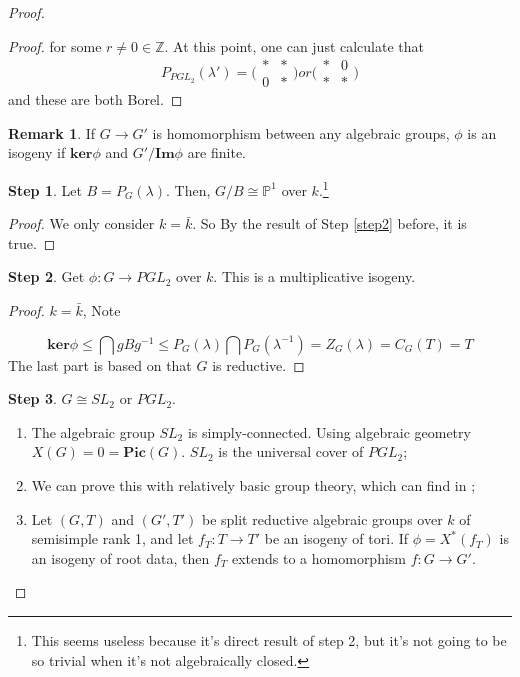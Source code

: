 \documentclass[12pt,a4paper,english]{article}
\theoremstyle{plain}
\theoremstyle{definition}
\newtheorem*{rem}{Remark}
\newtheorem{step}{Step}
\begin{document}
\begin{proof}
\begin{proof}
for some $r\not=0\in\mathbb{Z}$. At this point, one can just calculate that 
\begin{equation*}
    P_{PGL_{2}}(\lambda')=
    \bigg(\begin{array}{cc}
         *&*  \\
         0& *
    \end{array}\bigg)
or
\bigg(\begin{array}{cc}
     *&0  \\
     *& *
\end{array}\bigg)
\end{equation*}
and these are both Borel.
\end{proof}
\begin{rem}
If $G\rightarrow G'$ is homomorphism between any algebraic groups, $\phi$ is an isogeny if $\textbf{ker}\phi$ and $G'/\textbf{Im}\phi$ are finite.
\end{rem}
\begin{step}
Let $B=P_{G}(\lambda)$. Then, $G/B\cong \mathbb{P}^{1}$ over $k$.\footnote{This seems useless because it's direct result of step 2, but it's not going to be so trivial when it's not algebraically closed.}
\end{step}
\begin{proof}
We only consider $k=\bar{k}$. So By the result of Step \ref{step2} before, it is true.
\end{proof}
\begin{step}
Get $\phi:G\rightarrow PGL_{2}$ over $k$. This is a multiplicative isogeny.
\end{step}
\begin{proof}
$k=\bar{k}$, Note

\begin{equation*}
    \textbf{ker}\phi\leq \bigcap gBg^{-1}\leq P_{G}(\lambda)\bigcap P_{G}(\lambda^{-1})=Z_{G}(\lambda)=C_{G}(T)=T
\end{equation*}
The last part is based on that $G$ is reductive.
\end{proof}
\begin{step}
$G\cong SL_{2}$ or $PGL_{2}$.
\end{step}


\begin{enumerate}
    \item The algebraic group $SL_{2}$ is simply-connected. Using algebraic geometry $X(G)=0=\textbf{Pic}(G)$. $SL_{2}$ is the universal cover of $PGL_{2}$; \cite{milneiAG}
    \item We can prove this with relatively basic group theory, which can find in \cite{springer1994linear};
    \item  Let $(G, T)$ and $(G', T')$ be split reductive algebraic groups over $k$ of semisimple rank 1, and let $f_{T}:T\rightarrow T'$ be an isogeny of tori. If $\phi=X^{*}(f_{T})$ is an isogeny of root data, then $f_{T}$ extends to a homomorphism $f:G\rightarrow G'$. 


\end{enumerate}
\end{proof}
\end{document}

